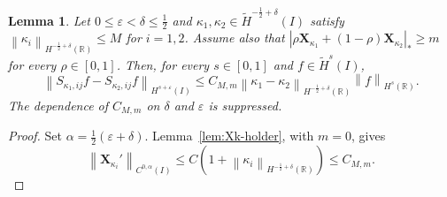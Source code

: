 \documentclass[11pt,reqno]{amsart}
\theoremstyle{plain}
\newtheorem{lemma}[theorem]{Lemma}
\theoremstyle{definition}
\numberwithin{equation}{section}
\newcommand{\paren}[1]{\left(#1\right)}
\newcommand{\wt}[1]{\widetilde{#1}}
\newcommand{\bm}[1]{\boldsymbol{#1}}
\newcommand{\abs}[1]{\left\lvert #1 \right\rvert}
\newcommand{\norm}[1]{\left\lVert #1 \right\rVert}
\newcommand{\R}{\mathbb{R}}
\newcommand{\xk}{\bm X_\kappa}
\newcommand{\thka}[1]{\theta_{\kappa_{#1}}}
\newcommand{\xka}[1]{\bm X_{\kappa_{#1}}}
\newcommand{\ci}[1]{C^{#1}(I)}
\newcommand{\hi}[1]{H^{#1}(I)}
\newcommand{\thi}[1]{\wt H^{#1}(I)}
\newcommand{\hr}[1]{H^{#1}(\R)}
\begin{document}
\begin{lemma}\label{lem:Sop-Lip}
Let $0\le\varepsilon<\delta\le\frac12$ and
$\kappa_1,\kappa_2\in\thi{-\frac12+\delta}$ satisfy
$\norm{\kappa_i}_{\hr{-\frac12+\delta}}\le M$ for $i=1,2$. Assume also that
$\abs{\rho\xka{1}+(1-\rho)\xka{2}}_*\ge m$ for every $\rho\in[0,1]$.
Then, for every $s\in[0,1]$ and $f\in\thi{s}$,
\begin{equation}\label{eqn:Sop-difference}
    \norm{S_{\kappa_1,ij}f-S_{\kappa_2,ij}f}
    _{\hi{s+\varepsilon}}
    \le C_{M,m}
    \norm{\kappa_1-\kappa_2}_{\hr{-\frac12+\delta}}
    \norm{f}_{\hr{s}}.
\end{equation}
The dependence of $C_{M,m}$ on $\delta$ and $\varepsilon$ is suppressed.
\end{lemma}
\begin{proof}
Set $\alpha=\frac12(\varepsilon+\delta)$.
Lemma~\ref{lem:Xk-holder}, with $m=0$, gives
\begin{equation}
    \norm{\bm X_{\kappa_i}'}_{\ci{0,\alpha}}
    \le C\paren{1+\norm{\kappa_i}_{\hr{-\frac12+\delta}}}
    \le C_{M,m}.
\end{equation}

\end{proof}
\end{document}
